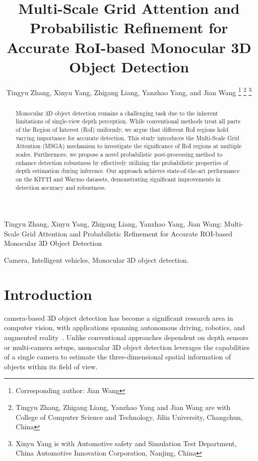 \documentclass[journal]{IEEEtran}
\begin{document}
	\title{Multi-Scale Grid Attention and Probabilistic Refinement for Accurate RoI-based Monocular 3D Object Detection}
	\author{Tingyu Zhang, Xinyu Yang, Zhigang Liang, Yanzhao Yang, and Jian Wang
		\thanks{Corresponding author: Jian Wang}
		\thanks{Tingyu Zhang, Zhigang Liang, Yanzhao Yang and Jian Wang are with College of Computer Science and Technology, Jilin University, Changchun, China}
		\thanks{Xinyu Yang is with Automotive safety and Simulation Test Department, China Automotive Innovation Corporation, Nanjing, China}}
	
	\markboth{}
	{Tingyu Zhang, Xinyu Yang, Zhigang Liang, Yanzhao Yang, Jian Wang:
		Multi-Scale Grid Attention and Probabilistic Refinement for Accurate ROI-based Monocular 3D Object Detection}
	
	\maketitle
	
	\begin{abstract}
		Monocular 3D object detection remains a challenging task due to the inherent limitations of single-view depth perception. While conventional methods treat all parts of the Region of Interest (RoI) uniformly, we argue that different RoI regions hold varying importance for accurate detection. This study introduces the Multi-Scale Grid Attention (MSGA) mechanism to investigate the significance of RoI regions at multiple scales. Furthermore, we propose a novel probabilistic post-processing method to enhance detection robustness by effectively utilizing the probabilistic properties of depth estimation during inference. Our approach achieves state-of-the-art performance on the KITTI and Waymo datasets, demonstrating significant improvements in detection accuracy and robustness.
	\end{abstract}
	
	\begin{IEEEkeywords}
		Camera, Intelligent vehicles, Monocular 3D object detection.
	\end{IEEEkeywords}
	
	
	\section{Introduction}
	\noindent{} camera-based 3D object detection has become a significant research area in computer vision, with applications spanning autonomous driving, robotics, and augmented reality~\cite{tits survey}. Unlike conventional approaches dependent on depth sensors or multi-camera setups, monocular 3D object detection leverages the capabilities of a single camera to estimate the three-dimensional spatial information of objects within its field of view.
	
\end{document}
